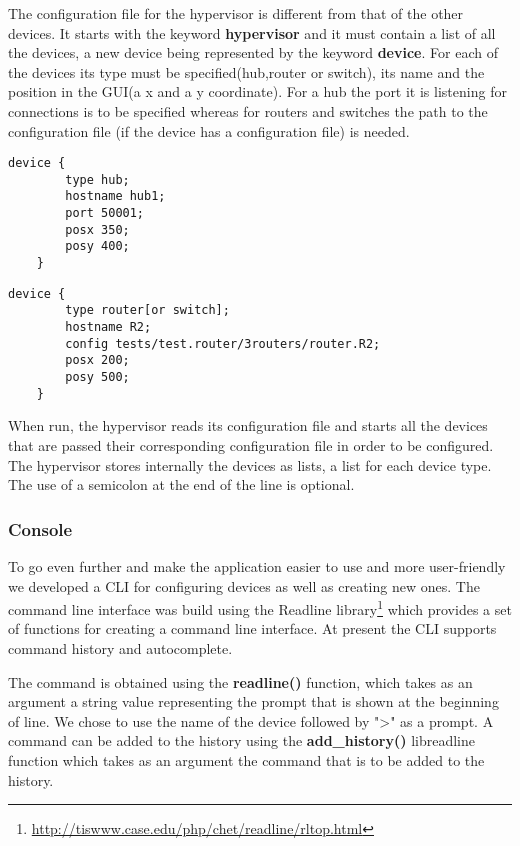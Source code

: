{{The configuration file for the hypervisor is different from that of the other devices. It starts with the keyword \textbf{hypervisor} and it must contain a list of all the devices, a new device being represented by the keyword \textbf{device}. For each of the devices its type must be specified(hub,router or switch), its name and the position in the GUI(a x and a y coordinate). For a hub the port it is listening for connections is to be specified whereas for routers and switches the path to the configuration file (if the device has a configuration file) is needed.    
\lstset{language=zsh,caption=Listing a Hub in hypervisor configuration file,label=lst:hy-config-file}
\begin{lstlisting}
device {
		type hub;
		hostname hub1;
		port 50001;
		posx 350;
		posy 400;
	}
\end{lstlisting}
\lstset{language=TeX,caption=Listing a Router/Switch in hypervisor configuration file,label=lst:hy-config-file}
\begin{lstlisting}
device {
		type router[or switch];
		hostname R2;
		config tests/test.router/3routers/router.R2;
		posx 200;
		posy 500;
	}
\end{lstlisting}
When run, the hypervisor reads its configuration file and starts all the devices that are passed their corresponding configuration file in order to be configured.
The hypervisor stores internally the devices as lists, a list for each device type. 
The use of a semicolon at the end of the line is optional.  
\subsubsection{Console}
\label{subsubsec:impl-console}
To go even further and make the application easier to use and more user-friendly we developed a CLI for configuring devices as well as creating new ones. The command line interface was build using the Readline library\footnote{\url{http://tiswww.case.edu/php/chet/readline/rltop.html}} which provides a set of functions for creating a command line interface. At present the CLI supports command history and autocomplete. 

The command is obtained using the \textbf{readline()} function, which takes as an argument a string value representing the prompt that is shown at the beginning of line. We chose to use the name of the device followed by ">" as a prompt. A command can be added to the history using the \textbf{add_history()} libreadline function which takes as an argument the command that is to be added to the history.

}}

